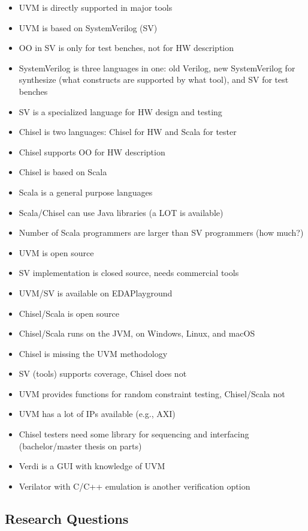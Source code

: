 \documentclass[a4paper, conference]{IEEEtran}
\begin{document}
\begin{itemize}
\item UVM is directly supported in major tools
\item UVM is based on SystemVerilog (SV)
\item OO in SV is only for test benches, not for HW description
\item SystemVerilog is three languages in one: old Verilog, new SystemVerilog for synthesize
(what constructs are supported by what tool), and SV for test benches
\item SV is a specialized language for HW design and testing
\item Chisel is two languages: Chisel for HW and Scala for tester
\item Chisel supports OO for HW description
\item Chisel is based on Scala
\item Scala is a general purpose languages
\item Scala/Chisel can use Java libraries (a LOT is available)
\item Number of Scala programmers are larger than SV programmers (how much?)
\item UVM is open source
\item SV implementation is closed source, needs commercial tools
\item UVM/SV is available on EDAPlayground
\item Chisel/Scala is open source
\item Chisel/Scala runs on the JVM, on Windows, Linux, and macOS
\item Chisel is missing the UVM methodology
\item SV (tools) supports coverage, Chisel does not
\item UVM provides functions for random constraint testing, Chisel/Scala not
\item UVM has a lot of IPs available (e.g., AXI)
\item Chisel testers need some library for sequencing and interfacing (bachelor/master thesis on parts)
\item Verdi is a GUI with knowledge of UVM
\item Verilator with C/C++ emulation is another verification option
\end{itemize}

\subsection{Research Questions}
\end{document}
